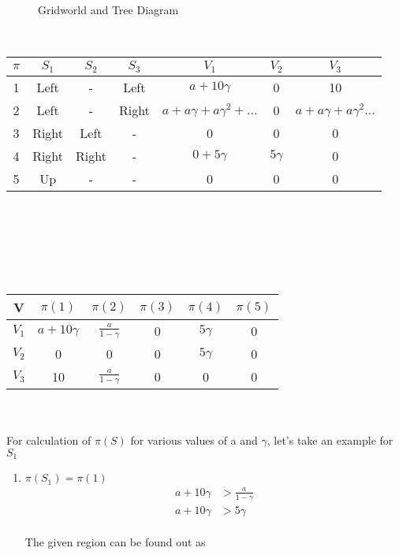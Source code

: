 \documentclass[english]{article}
\providecommand{\tabularnewline}{\\}
\begin{document}
\begin{enumerate}
\begin{figure}
\caption{Gridworld and Tree Diagram}
\end{figure}
\\
\begin{tabular}{|c|c|c|c||c|c|c}
\hline 
$\pi$ & $S_{1}$ & $S_{2}$ & $S_{3}$ & $V_{1}$ & $V_{2}$ & $V_{3}$\tabularnewline
\hline 
\hline 
1 & Left & - & Left & $a+10\gamma$ & 0 & 10\tabularnewline
\hline 
2 & Left & - & Right & $a+a\gamma+a\gamma^{2}+...$ & 0 & $a+a\gamma+a\gamma^{2}...$\tabularnewline
\hline 
3 & Right & Left & - & 0 & 0 & 0\tabularnewline
\hline 
4 & Right & Right & - & $0+5\gamma$ & $5\gamma$ & 0\tabularnewline
\hline 
5 & Up & - & - & 0 & 0 & 0\tabularnewline
\hline 
\end{tabular}\\
\\
\\
\\
\\
\begin{tabular}{|c|c|c|c|c||c}
\hline 
V & $\pi(1)$ & $\pi(2)$ & $\pi(3)$ & $\pi(4)$ & $\pi(5)$\tabularnewline
\hline 
\hline 
$V_{1}$ & $a+10\gamma$ & $\frac{a}{1-\gamma}$ & 0 & $5\gamma$ & 0\tabularnewline
\hline 
$V_{2}$ & 0 & 0 & 0 & $5\gamma$ & 0\tabularnewline
\hline 
$V_{3}$ & 10 & $\frac{a}{1-\gamma}$ & 0 & 0 & 0\tabularnewline
\hline 
\end{tabular}\\
\\
For calculation of $\pi(S)$ for various values of a and $\gamma$,
let's take an example for $S_{1}$\\
\begin{enumerate}
\item $\pi(S_{1})=\pi(1)$\\
\begin{align*}
a+10\gamma & >\frac{a}{1-\gamma}\\
a+10\gamma & >5\gamma
\end{align*}
\\
The given region can be found out as\\
\begin{figure}[H]


\end{figure}
\end{enumerate}
\end{enumerate}
\end{document}
